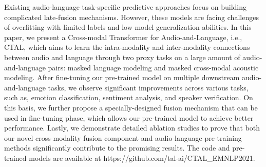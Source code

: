 Existing audio-language task-specific predictive approaches focus on building complicated late-fusion mechanisms. However, these models are facing challenges of overfitting with limited labels and low model generalization abilities. In this paper, we present a Cross-modal Transformer for Audio-and-Language, i.e., CTAL, which aims to learn the intra-modality and inter-modality connections between audio and language through two proxy tasks on a large amount of audio-and-language pairs: masked language modeling  and masked cross-modal acoustic modeling. After fine-tuning our pre-trained model on multiple downstream audio-and-language tasks, we observe significant improvements across various tasks, such as, emotion classification, sentiment analysis, and speaker verification. On this basis, we further propose a specially-designed fusion mechanism that can be used in fine-tuning phase, which allows our pre-trained model to achieve better performance. Lastly, we demonstrate detailed ablation studies to prove that both our novel cross-modality fusion component and audio-language pre-training methods significantly contribute to the promising results. The code and pre-trained models are available at https://github.com/tal-ai/CTAL\_EMNLP2021.
